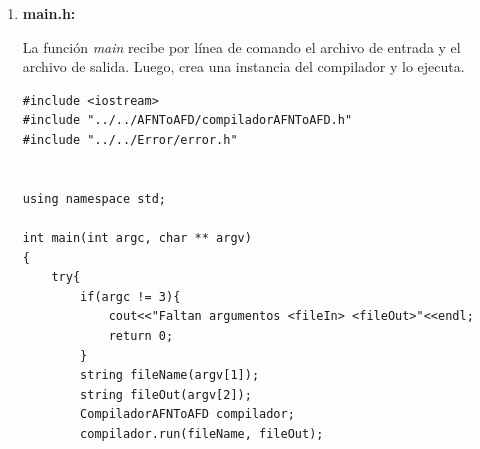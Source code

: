 \documentclass[a4paper,12pt]{article}
\begin{document}
\begin{enumerate}
\begin{lstlisting}
Automata CompiladorAFNToAFD::run(string inFile, string outFile){
    Automata automata(inFile);
    Automata res;
    estadoActual = 0;
    list<Estado *> pila;
    res.inicial = new Estado(estadoActual,automata.e_clausura({automata.inicial}));
    estadoActual++;
    res.estados.push_back(res.inicial);
    res.entradas = automata.entradas;
    res.expresionRegular = automata.expresionRegular;
    pila.push_front(res.estados.back());
    Estado * actual = nullptr;
    Estado * temp = nullptr;
    while(!pila.empty()){
        actual = pila.front();
        pila.pop_front();   
        for(char caracter : automata.entradas){
            vector<Estado *> subConjunto = automata.e_clausura(automata.findTransiciones(actual->subEstados,caracter));
            if(!subConjunto.empty()){
                temp = res.findSubConjunto(subConjunto);
                if(temp == nullptr){
                    temp = new Estado(estadoActual,subConjunto);
                    estadoActual++;
                    res.estados.push_back(temp);
                    pila.push_front(temp);
                }
                res.transiciones.push_back(make_tuple(actual,caracter,temp));
                actual->transiciones.push_back(make_tuple(nullptr,caracter,temp));
            }
            
        }
    }
    for(Estado * estado : res.estados){
        for(Estado * subEstado : estado->subEstados){
            if(automata.esAceptacion(subEstado->id)){
                res.aceptacion.push_back(estado);
                break;
            }
        }   
    }

    if(outFile == "cout") res.printAutomata(cout, true);
    else{
        ofstream out(outFile.c_str());
        res.printAutomata(out, true);
    }
    return res;
}


#endif
 \end{lstlisting}

 \item \textbf{main.h:} \par
 La función \textit{main} recibe por línea de comando el archivo de entrada y el archivo de salida. Luego, crea una instancia del compilador y lo ejecuta.
  
 \begin{lstlisting}
#include <iostream>
#include "../../AFNToAFD/compiladorAFNToAFD.h"
#include "../../Error/error.h"


using namespace std;

int main(int argc, char ** argv)
{
    try{
        if(argc != 3){
            cout<<"Faltan argumentos <fileIn> <fileOut>"<<endl;
            return 0;
        }
        string fileName(argv[1]);
        string fileOut(argv[2]);
        CompiladorAFNToAFD compilador;
        compilador.run(fileName, fileOut);
        

\end{lstlisting}
\end{enumerate}
\end{document}
